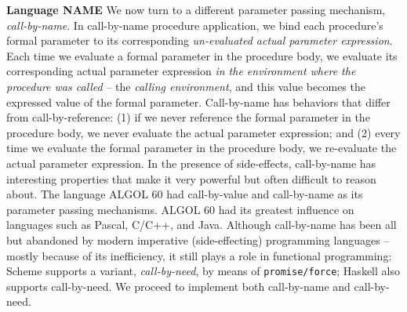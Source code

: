 \begin{minipage}[t]{\sw}
\slidenumber
\LARGE
{\bf Language NAME}\exx
We now turn to a different parameter passing mechanism,
{\em call-by-name}.
In call-by-name procedure application,
we bind each procedure's formal parameter
to its corresponding {\em un-evaluated actual parameter expression}.
Each time we evaluate a formal parameter in the procedure body,
we evaluate its corresponding actual parameter expression
{\em in the environment where the procedure was called}
-- the {\em calling environment},
and this value becomes the expressed value of the formal parameter.\exx
Call-by-name has behaviors that differ from call-by-reference:
(1)
if we never reference the formal parameter in the procedure body,
we never evaluate the actual parameter expression; and
(2)
every time we evaluate the formal parameter in the procedure body,
we re-evaluate the actual parameter expression.\exx
In the presence of side-effects, call-by-name has interesting
properties that make it very powerful
but often difficult to reason about.
The language ALGOL 60 had call-by-value and call-by-name
as its parameter passing mechanisms.
ALGOL 60 had its greatest influence on languages
such as Pascal, C/C++, and Java.
Although call-by-name has been all but abandoned
by modern imperative (side-effecting) programming languages --
mostly because of its inefficiency,
it still plays a role in functional programming:
Scheme supports a variant, {\em call-by-need},
by means of \verb'promise/force';
Haskell also supports call-by-need.
We proceed to implement both call-by-name and call-by-need.
\end{minipage}
\clearpage
